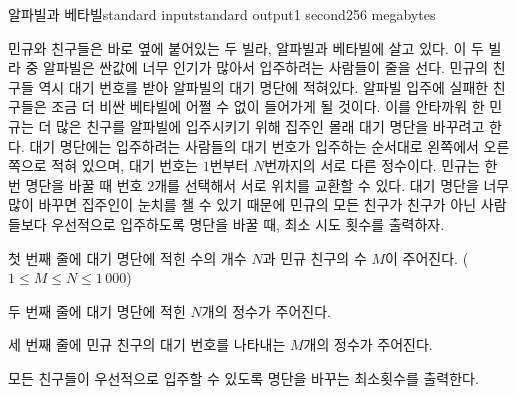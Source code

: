 \begin{problem}{알파빌과 베타빌}{standard input}{standard output}{1 second}{256 megabytes}

민규와 친구들은 바로 옆에 붙어있는 두 빌라, 알파빌과 베타빌에 살고 있다. 이 두 빌라 중 알파빌은 싼값에 너무 인기가 많아서 입주하려는 사람들이 줄을 선다. 민규의 친구들 역시 대기 번호를 받아 알파빌의 대기 명단에 적혀있다. 알파빌 입주에 실패한 친구들은 조금 더 비싼 베타빌에 어쩔 수 없이 들어가게 될 것이다. 이를 안타까워 한 민규는 더 많은 친구를 알파빌에 입주시키기 위해 집주인 몰래 대기 명단을 바꾸려고 한다. 대기 명단에는 입주하려는 사람들의 대기 번호가 입주하는 순서대로 왼쪽에서 오른쪽으로 적혀 있으며, 대기 번호는 $1$번부터 $N$번까지의 서로 다른 정수이다. 민규는 한 번 명단을 바꿀 때 번호 $2$개를 선택해서 서로 위치를 교환할 수 있다. 대기 명단을 너무 많이 바꾸면 집주인이 눈치를 챌 수 있기 때문에 민규의 모든 친구가 친구가 아닌 사람들보다 우선적으로 입주하도록 명단을 바꿀 때, 최소 시도 횟수를 출력하자. 

\InputFile
첫 번째 줄에 대기 명단에 적힌 수의 개수 $N$과 민규 친구의 수 $M$이 주어진다. ($1 \le M \le N \le 1\,000$) 

두 번째 줄에 대기 명단에 적힌 $N$개의 정수가 주어진다.

세 번째 줄에 민규 친구의 대기 번호를 나타내는 $M$개의 정수가 주어진다.


\OutputFile
모든 친구들이 우선적으로 입주할 수 있도록 명단을 바꾸는 최소횟수를 출력한다.

\Examples

\begin{example}
%
%
\end{example}

\end{problem}

